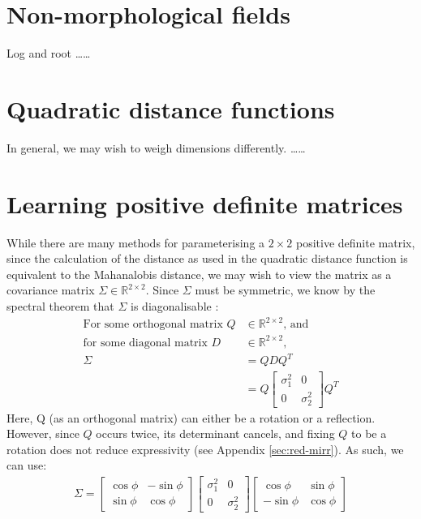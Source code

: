\documentclass[a4paper, 12pt]{report}
\def\comment#1{\color{red}#1\color{black}}
\begin{document}
\section{Non-morphological fields}
Log and root \cite{bellaardaxiomatic} \comment{\ldots\ldots}

\section{Quadratic distance functions}
In general, we may wish to weigh dimensions differently. \cite{Boomgaard1999NumericalSS} \comment{\ldots\ldots}

\newpage
\section{Learning positive definite matrices}
\label{sec:learning-pdm}
While there are many methods for parameterising a $2\times2$ positive definite matrix, since the calculation of the distance as used in the quadratic distance function is equivalent to the Mahanalobis distance, we may wish to view the matrix as a covariance matrix $\Sigma \in \mathbb{R}^{2\times2}$. Since $\Sigma$ must be symmetric, we know by the spectral theorem that $\Sigma$ is diagonalisable \cite{poole2015linear}:
\begin{align}
\textrm{For some orthogonal matrix }Q &\in \mathbb{R}^{2\times 2} \textrm{, and} \nonumber \\
\textrm{for some diagonal matrix }D &\in \mathbb{R}^{2\times 2} \textrm{,}\nonumber \\
\Sigma &= QDQ^T\\
&= Q \begin{bmatrix}
	 \sigma_1^2 & 0\\ 0 &  \sigma_2^2
\end{bmatrix} Q^T
\end{align}
Here, Q (as an orthogonal matrix) can either be a rotation  or a reflection. However, since $Q$ occurs twice, its determinant cancels, and fixing $Q$ to be a rotation does not reduce expressivity (see Appendix \ref{sec:red-mirr}). As such, we can use:
\begin{align}
\Sigma = \begin{bmatrix}
	\cos \phi & -\sin \phi \\ \sin\phi & \cos\phi
\end{bmatrix}\begin{bmatrix}
	 \sigma_1^2 & 0\\ 0 &  \sigma_2^2
\end{bmatrix} \begin{bmatrix}
	\cos \phi & \sin \phi \\ -\sin\phi & \cos\phi
\end{bmatrix}
\end{align}
\end{document}
